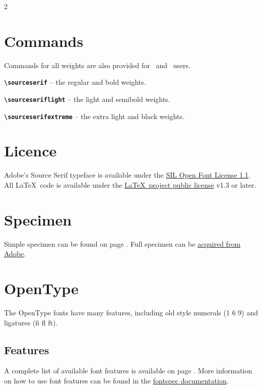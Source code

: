 \documentclass[10pt,a4paper,english]{article}
\begin{document}
\begin{multicols}{2}
\section{Commands}
Commands for all weights are also provided for \XeLaTeX\ and \LuaLaTeX\ users.
\begin{itemize*}
	\item \texttt{\bfseries \textbackslash sourceserif}
		-- the regular and bold weights.
	\item \texttt{\bfseries \textbackslash sourceseriflight}
		-- the light and semibold weights.
	\item \texttt{\bfseries \textbackslash sourceserifextreme}
		-- the extra light and black weights.
\end{itemize*}

\section{Licence}
Adobe's Source Serif typeface is available under the \href{http://scripts.sil.org/OFL}{SIL Open Font License 1.1}.\\
All \LaTeX\ code is available under the \href{http://www.latex-project.org/lppl/}{\LaTeX\ project public license} v1.3 or later.

\section{Specimen}
Simple specimen can be found on page \pageref{sec:specimen}. Full specimen can be \href{http://store1.adobe.com/type/browser/pdfs/1966.pdf}{acquired from Adobe}.

\section{OpenType}
The OpenType fonts have many features, including old style numerals (1 6 9) and ligatures (fi fl ft).

\subsection{Features}
A complete list of available font features is available on page \pageref{sec:otfinfo}. More information on how to use font features can be found in the \href{http://mirror.ctan.org/macros/latex/contrib/fontspec/fontspec.pdf}{fontspec documentation}.


\end{multicols}
\end{document}

